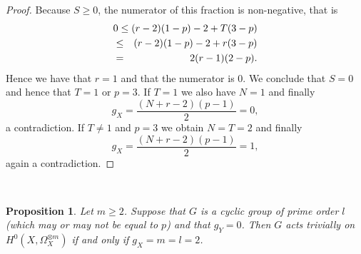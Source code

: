 \documentclass[draft, 11pt]{article} %
\theoremstyle{plain}
\newtheorem{prop}[defn]{Proposition}
\theoremstyle{remark}
\begin{document}
\begin{proof}
    Because $S \geq 0$, the numerator of this fraction is non-negative, that is
      \begin{eqnarray*}
	\lefteqn{0 \le (r-2)(1-p) - 2 + T (3-p)}\\
	&\le & (r-2)(1-p) - 2 + r (3-p)\\
	&=& 2 (r-1)(2-p).
      \end{eqnarray*}
    Hence we have that $r=1$ and that the numerator is $0$. 
    We conclude that $S=0$ and hence that $T=1$ or $p=3$. 
    If $T=1$ we also have $N=1$ and finally
      \[
	g_X = \frac{(N+r-2)(p-1)}{2} = 0,
      \]
	a contradiction.
    If $T \not=1$ and $p=3$ we obtain $N=T=2$ and finally 
      \[
	g_X = \frac{(N+r-2)(p-1)}{2} =1,
      \] 
  again a contradiction.
  \end{proof}
~
  \begin{prop}\label{triv}
    Let $m \geq 2$. 
    Suppose that $G$ is a cyclic group of prime order $l$ (which may or may not be equal to $p$) and that $g_Y=0$. 
    Then $G$ acts trivially on $H^0(X,\Omega_X^{\otimes m})$ if and only if $g_X=m=l=2$.
  \end{prop}
\end{document}
